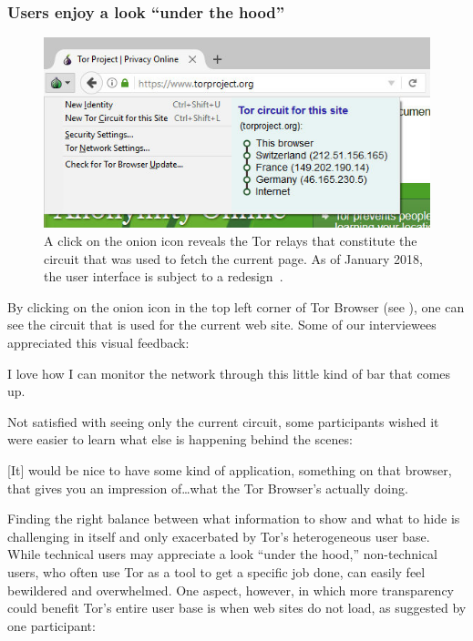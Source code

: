 \subsubsection{Users enjoy a look ``under the hood''}
\label{sec:under-the-hood}

\begin{figure}[t]
    \centering
    \includegraphics[width=\linewidth]{figures/tor-button-screenshot.jpg}
    \caption{A click on the onion icon reveals the Tor relays that constitute
    the circuit that was used to fetch the current page.  As of January 2018,
    the user interface is subject to a redesign~\cite{trac24309}.}
    \label{fig:tor-button}
\end{figure}

By clicking on the onion icon in the top left corner of Tor Browser (see
), one can see the circuit that is used for the current web
site.  Some of our interviewees appreciated this visual feedback:

\begin{displayquote}[P08]
I love how I can monitor the network through this little kind of bar that comes
up.
\end{displayquote}

Not satisfied with seeing only the current circuit, some participants wished it
were easier to learn what else is happening behind the scenes:

\begin{displayquote}[P02]
{[It]} would be nice to have some kind of application, something on that browser,
that gives you an impression of\dots what the Tor Browser's actually doing.
\end{displayquote}

Finding the right balance between what information to show and what to hide is
challenging in itself and only exacerbated by Tor's heterogeneous user base.
While technical users may appreciate a look ``under the hood,'' non-technical
users, who often use Tor as a tool to get a specific job done, can easily feel
bewildered and overwhelmed.  One aspect, however, in which more transparency could
benefit Tor's entire user base is when web sites do not load, as suggested by
one participant:

